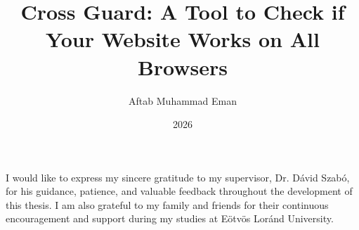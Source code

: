 \documentclass[
]{elteikthesis}[2024/04/26]
\title{Cross Guard: A Tool to Check if Your Website Works on All Browsers} %
\date{2026} %
\author{Aftab Muhammad Eman}
\affiliation{Assistant Professor} %
\begin{document}


\maketitle


\tableofcontents
\cleardoublepage


\cleardoublepage


\cleardoublepage


\cleardoublepage


\cleardoublepage

\chapter*{\acklabel}
I would like to express my sincere gratitude to my supervisor, Dr. Dávid Szabó, for his guidance, patience, and valuable feedback throughout the development of this thesis. I am also grateful to my family and friends for their continuous encouragement and support during my studies at Eötvös Loránd University.

{}
\printbibliography[title=\biblabel]
\cleardoublepage

{}
\listoffigures
\cleardoublepage

{}
\listoftables
\cleardoublepage

{}
\lstlistoflistings

\end{document}
